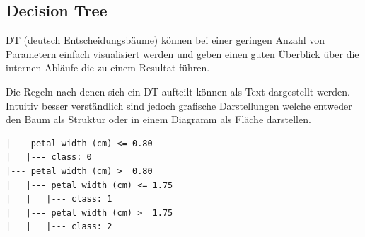 \documentclass[
  12pt, %
  a4paper, %
  oneside, %
  openany, 
  numbers=noenddot, %
  BCOR=5mm, %
  parskip=half*, %
  thesis, %
]{bfhbook}
\begin{document}
\subsection{Decision Tree}
\label{DT}
\Gls{DT} (deutsch Entscheidungsbäume) können bei einer geringen Anzahl von Parametern einfach visualisiert werden und geben einen guten Überblick über die internen Abläufe die zu einem Resultat führen.
\begin{center}
\begin{minipage}[t]{0.45\linewidth}
\vspace{10pt}
Die Regeln nach denen sich ein \Gls{DT} aufteilt können als Text dargestellt werden. Intuitiv besser verständlich sind jedoch grafische Darstellungen welche entweder den Baum als Struktur oder in einem Diagramm als Fläche darstellen.
\end{minipage}\hfill
\begin{minipage}[t]{0.45\linewidth}
\begin{lstlisting}
|--- petal width (cm) <= 0.80
|   |--- class: 0
|--- petal width (cm) >  0.80
|   |--- petal width (cm) <= 1.75
|   |   |--- class: 1
|   |--- petal width (cm) >  1.75
|   |   |--- class: 2
\end{lstlisting}
\end{minipage}
\end{center}
\end{document}
